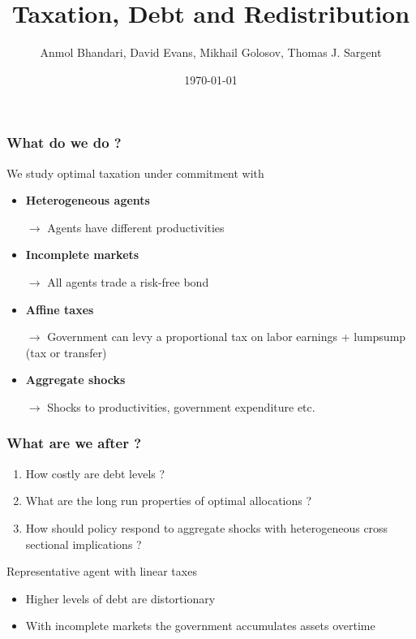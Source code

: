 \documentclass{beamer}
\title {Taxation, Debt and Redistribution}
\author{Anmol Bhandari, David Evans, Mikhail Golosov, Thomas J. Sargent}
\date{\today}
\begin{document}
%
\begin{frame}
\titlepage

\end{frame}

\begin{frame}
\frametitle{What do we do ?}
We study optimal taxation under commitment with
\begin{itemize}
 \item \textbf{Heterogeneous agents}
 
 \quad \color{red}$\rightarrow$ \color{black}Agents  have different productivities
 
 \item \textbf{Incomplete markets}
 
 \quad \color{red}$\rightarrow$ \color{black}All agents trade a risk-free bond
 
 \item \textbf{Affine taxes}
 
 \quad \color{red}$\rightarrow$ \color{black}Government can levy a proportional tax on labor earnings + lumpsump (tax or transfer) 
 
 \item \textbf{Aggregate shocks}
 
 \quad \color{red}$\rightarrow$ \color{black}Shocks to productivities, government expenditure etc.

 \end{itemize}
\end{frame}


\begin{frame}
\frametitle{What are we after ?}

\begin{enumerate}
 \item How costly are debt levels ?
 \item What are the long run properties of optimal allocations ?
\item How should policy respond to aggregate shocks with heterogeneous cross sectional implications ?
\end{enumerate}
 Representative agent with linear taxes
\begin{itemize}
 \item Higher levels of debt are distortionary
 \item With incomplete markets the government accumulates assets overtime
 \end{itemize}
 
 \end{frame}
 
\end{document}
